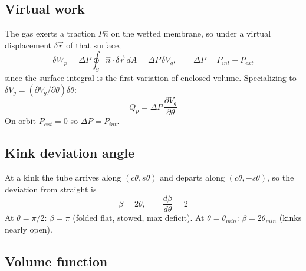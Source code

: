 \documentclass[11pt]{article}
\newcommand{\st}{s\theta}
\newcommand{\ct}{c\theta}
\newcommand{\Vg}{V_g}                 %
\newcommand{\DP}{\Delta P}
\begin{document}
\subsection*{Virtual work}

The gas exerts a traction $P\hat{n}$ on the wetted membrane, so under a virtual displacement
$\delta\vec{r}$ of that surface,
\begin{equation}
\delta W_p = \DP \oint_S \hat{n}\cdot\delta\vec{r}\,dA = \DP\,\delta \Vg,
\qquad \DP = P_{int}-P_{ext}
\end{equation}
since the surface integral is the first variation of enclosed volume. Specializing to $\delta \Vg =
(\partial \Vg/\partial\theta)\delta\theta$:
\begin{equation}
Q_p = \DP\,\frac{\partial \Vg}{\partial\theta}
\label{eq:Qp}
\end{equation}
On orbit $P_{ext}=0$ so $\DP = P_{int}$.



\subsection*{Kink deviation angle}

At a kink the tube arrives along $(\ct,\st)$ and departs along $(\ct,-\st)$, so the deviation from
straight is
\begin{equation}
\beta = 2\theta, \qquad \frac{d\beta}{d\theta} = 2
\end{equation}
At $\theta=\pi/2$: $\beta=\pi$ (folded flat, stowed, max deficit). At $\theta=\theta_{min}$:
$\beta = 2\theta_{min}$ (kinks nearly open).

\subsection*{Volume function}
\end{document}
